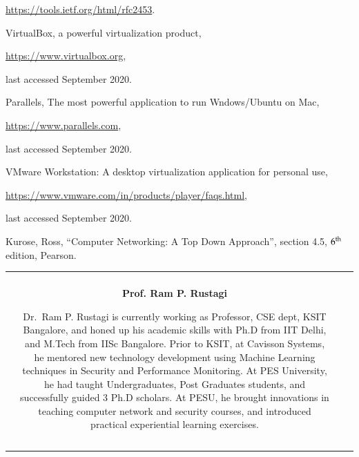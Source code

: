 \begin{multicols}{2}
\begin{thebibliography}{99}
\url{https://tools.ietf.org/html/rfc2453}.

 VirtualBox, a powerful virtualization product,

\url{https://www.virtualbox.org},

last accessed September 2020.

 Parallels, The most powerful application to run Wndows/Ubuntu on Mac,

\url{https://www.parallels.com},

last accessed September 2020.

 VMware Workstation: A desktop virtualization application for personal use,

\url{https://www.vmware.com/in/products/player/faqs.html},

last accessed September 2020.

 Kurose, Ross, “Computer Networking: A Top Down Approach”, section 4.5, $6^{\rm th}$ edition, Pearson.

\end{thebibliography}

\end{multicols}


\noindent
\begin{tabular}{V{2.5}cp{14.2cm}V{2.5}}
 &\\
 & 

\centerline{\large\bf Prof. Ram P. Rustagi}

\bigskip
Dr.~Ram P. Rustagi is currently working as Professor, CSE dept, KSIT Bangalore, and honed up his academic skills with Ph.D from IIT Delhi, and M.Tech from IISc Bangalore. Prior to KSIT, at Cavisson Systems, he mentored new technology development using Machine Learning techniques in Security and Performance Monitoring. At PES University, he had taught Undergraduates, Post Graduates students, and successfully guided 3 Ph.D scholars. At PESU, he brought innovations in teaching computer network and security courses, and introduced practical experiential learning exercises.\\
&\\ 
\end{tabular}
